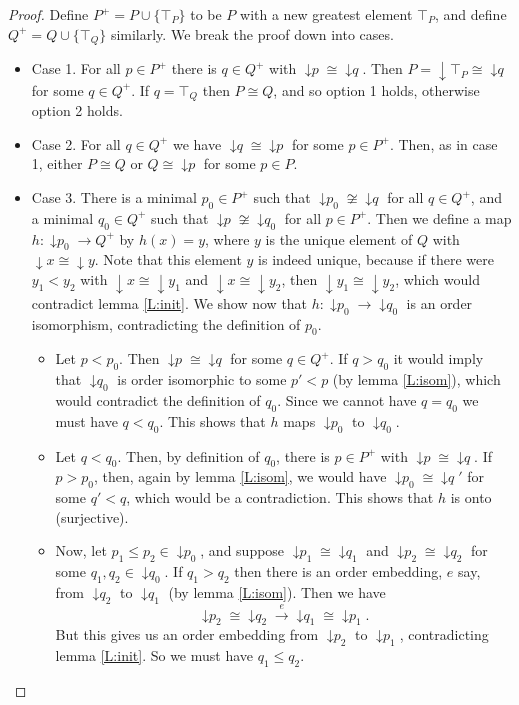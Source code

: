 \documentclass{article}
\theoremstyle{plain}
\DeclareMathOperator{\ISp}{\downarrow \mathit{p}}
\DeclareMathOperator{\ISq}{\downarrow \mathit{q}}
\begin{document}
\begin{proof}
Define $P^+=P\cup\{\top_P\}$ to be $P$ with a new greatest element $\top_P$, and define $Q^+=Q\cup\{\top_Q\}$ similarly. We break the proof down into cases. 
\begin{itemize}
\item[] Case 1. For all $p\in P^+$ there is $q\in Q^+$ with $\ISp \cong \ISq$. Then $P= \downarrow\top_P\cong \ISq$ for some $q\in Q^+$. If $q=\top_Q$ then $P\cong Q$, and so option 1 holds, otherwise option 2 holds.
\item[] Case 2. For all $q\in Q^+$ we have $\ISq \cong \ISp$ for some $p\in P^+$. Then, as in case 1, either $P\cong Q$ or $Q\cong \ISp$ for some $p\in P$.
\item[] Case 3. There is a minimal $p_0\in P^+$ such that $\ISp_0 \not\cong \ISq$ for all $q\in Q^+$, and a minimal $q_0\in Q^+$ such that $\ISp \not\cong \ISq_0$ for all $p\in P^+$. Then we define a map $h : \ISp_0 \to Q^+$ by $h(x) =y$, where $y$ is the unique element of $Q$ with $\downarrow x \cong \downarrow y$. Note that this element $y$ is indeed unique, because if there were $y_1< y_2$ with $\downarrow x \cong \downarrow y_1$ and $\downarrow x \cong \downarrow y_2$, then $\downarrow y_1 \cong \downarrow y_2$, which would contradict lemma \ref{L:init}.  We show now that $h:\ISp_0\to \ISq_0$ is an order isomorphism, contradicting the definition of $p_0$.
\begin{itemize}
\item Let $p< p_0$. Then $\ISp \cong \ISq$ for some $q\in Q^+$. If $q> q_0$ it would imply that $\ISq_0$ is order isomorphic to some $p' < p$ (by lemma \ref{L:isom}), which would contradict the definition of $q_0$. Since we cannot have $q=q_0$ we must have $q<q_0$. This shows that $h$ maps $\ISp_0$ to $\ISq_0$.
\item Let $q < q_0$. Then, by definition of $q_0$, there is $p\in P^+$ with $\ISp\cong \ISq$. If $p> p_0$, then, again by lemma \ref{L:isom}, we would have $\ISp_0\cong \ISq'$ for some $q'< q$, which would be a contradiction. This shows that $h$ is onto (surjective).
\item Now, let $p_1\leq p_2 \in \ISp_0$, and suppose $\ISp_1 \cong \ISq_1$ and $\ISp_2 \cong \ISq_2$ for some $q_1,q_2\in \ISq_0$. If $q_1> q_2$ then there is an order embedding, $e$ say, from $\ISq_2$ to $\ISq_1$ (by lemma \ref{L:isom}). Then we have 
\[\ISp_2\cong \ISq_2\xrightarrow{e}\ISq_1\cong \ISp_1.\]  
But this gives us an order embedding from $\ISp_2$ to $\ISp_1$, contradicting lemma \ref{L:init}. So we must have $q_1\leq q_2$.


\end{itemize}
\end{itemize}
\end{proof}
\end{document}
